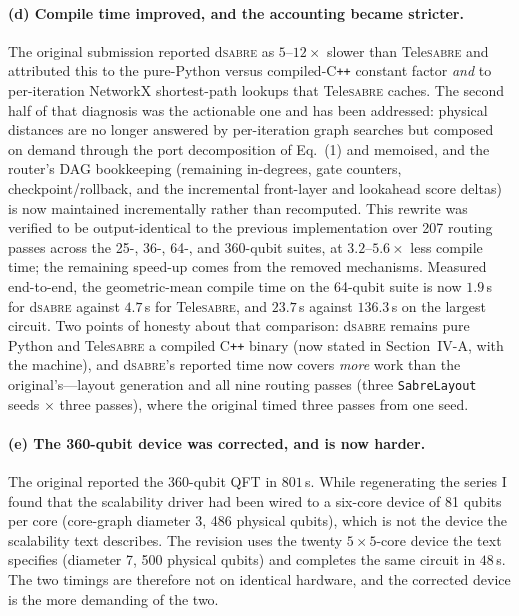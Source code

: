\documentclass[11pt]{article}
\newcommand{\dSABRE}{d\textsc{sabre}}
\newcommand{\TeleSABRE}{Tele\textsc{sabre}}
\begin{document}
\paragraph{(d) Compile time improved, and the accounting became stricter.}
The original submission reported \dSABRE{} as $5$--$12\times$ slower than
\TeleSABRE{} and attributed this to the pure-Python versus compiled-C\texttt{++}
constant factor \emph{and} to per-iteration NetworkX shortest-path lookups that
\TeleSABRE{} caches. The second half of that diagnosis was the actionable one
and has been addressed: physical distances are no longer answered by
per-iteration graph searches but composed on demand through the port
decomposition of Eq.~(1) and memoised, and the router's DAG bookkeeping
(remaining in-degrees, gate counters, checkpoint/rollback, and the incremental
front-layer and lookahead score deltas) is now maintained incrementally rather
than recomputed. This rewrite was verified to be output-identical to the
previous implementation over 207 routing passes across the 25-, 36-, 64-, and
360-qubit suites, at $3.2$--$5.6\times$ less compile time; the remaining
speed-up comes from the removed mechanisms. Measured end-to-end, the
geometric-mean compile time on the 64-qubit suite is now $1.9$\,s for
\dSABRE{} against $4.7$\,s for \TeleSABRE{}, and $23.7$\,s against $136.3$\,s
on the largest circuit. Two points of honesty about that comparison:
\dSABRE{} remains pure Python and \TeleSABRE{} a compiled C\texttt{++} binary
(now stated in Section~IV-A, with the machine), and \dSABRE{}'s reported time
now covers \emph{more} work than the original's---layout generation and all
nine routing passes (three \texttt{SabreLayout} seeds $\times$ three passes),
where the original timed three passes from one seed.

\paragraph{(e) The 360-qubit device was corrected, and is now harder.}
The original reported the 360-qubit QFT in $801$\,s. While regenerating the
series I found that the scalability driver had been wired to a six-core device
of 81 qubits per core (core-graph diameter 3, 486 physical qubits), which is
not the device the scalability text describes. The revision uses the twenty
$5\times5$-core device the text specifies (diameter 7, 500 physical qubits) and
completes the same circuit in $48$\,s. The two timings are therefore not on
identical hardware, and the corrected device is the more demanding of the two.
\end{document}
